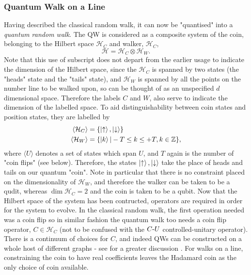 \subsubsection{Quantum Walk on a Line}
\label{subsubsection:q_r_w}
Having described the classical random walk, it can now be "quantised" into a \emph{quantum random walk}.
The QW is considered as a composite system of the coin, belonging to the Hilbert space $\mathcal{H}_C$ and walker, $\mathcal{H}_C$,
\begin{equation}
    \mathcal{H} = \mathcal{H}_C \otimes \mathcal{H}_W.
\end{equation}
Note that this use of subscript does not depart from the earlier usage to indicate the dimension of the Hilbert space, since the $\mathcal{H}_C$ is spanned by two states (the "heads" state and the "tails" state), and $\mathcal{H}_W$ is spanned by all the points on the number line to be walked upon, so can be thought of as an unspecified $d$ dimensional space.
Therefore the labels $C$ and $W$, also serve to indicate the dimension of the labelled space.\newline
To aid distinguishability between coin states and position states, they are labelled by
\begin{align}
    \langle\mathcal{H}_C\rangle &= \{\ket{\uparrow}, \ket{\downarrow}\}\\
    \langle\mathcal{H}_W\rangle &= \{\ket{k} | -T\leq k \leq +T, k\in\mathbb{Z}\},
\end{align}
where $\langle U \rangle$ denotes a set of states which span $U$, and $T$ again is the number of "coin flips" (see below). 
Therefore, the states $\ket{\uparrow}, \ket{\downarrow}$ take the place of heads and tails on our quantum "coin". 
Note in particular that there is no constraint placed on the dimensionality of $\mathcal{H}_W$, and therefore the walker can be taken to be a qudit, whereas $\dim{\mathcal{H}_C} = 2$ and the coin is taken to be a qubit.
Now that the Hilbert space of the system has been contructed, operators are required in order for the system to evolve.
In the classical random walk, the first operation needed was a coin flip so in similar fashion the quantum walk too needs a coin flip operator, $C\in \mathcal{H}_C$ (not to be confused with the $C\text{-}U$ controlled-unitary operator).
There is a continuum of choices for $C$, and indeed QWs can be constructed on a whole host of different graphs - see for a greater discussion \cite{Tregenna2003}. 
For walks on a line, constraining the coin to have real coefficients leaves the Hadamard coin as the only choice of coin available.
